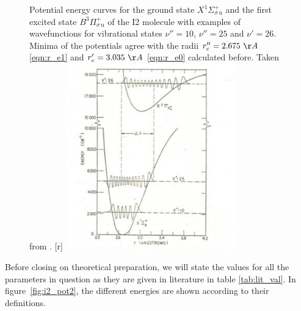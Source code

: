\begin{figure}[!t]
  \begin{captionbeside}[]{Potential energy curves for the ground state 
    $X ^1\Sigma_{\sigma \, \mathrm{u}}^{+}$ and the first excited state 
    $B ^3\Pi_{\sigma \, \mathrm{u}}^{+}$ of the I2 molecule with examples 
    of wavefunctions for vibrational states $\nu'' = 10$, $\nu'' = 25$ and 
    $\nu' = 26$. Minima of the potentials agree with the radii 
    $r_e'' = 2.675\ \AA$ \eqref{eqn:r_e1} and 
    $r_e'  = 3.035\ \AA$ \eqref{eqn:r_e0} calculated before. 
    Taken from \cite{zare1964calculation}.
    }[r]
    \includegraphics[width=0.65\textwidth]{pics/i2_pot.pdf}
  \end{captionbeside}
    \label{fig:i2_pot}
\end{figure}

Before closing on theoretical preparation, we will state the values for all the 
parameters in question as they are given in literature in table \ref{tab:lit_val}.
In figure~\ref{fig:i2_pot2}, the different energies are shown according to their 
definitions. 

